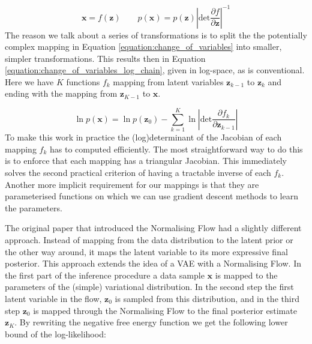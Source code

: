 \documentclass{report}
\newcommand{\bx}{\mathbf{x}}
\newcommand{\bz}{\mathbf{z}}
\newcommand{\parfrac}[2]{\frac{\partial #1}{\partial#2}}
\begin{document}
\begin{equation}\label{equation:change_of_variables}
    \bx = f(\bz) \qquad p(\bx) = p(\bz) \left|\text{det} \parfrac{f}{\bz} \right|^{-1}
\end{equation}
The reason we talk about a series of transformations is to split the the potentially complex mapping in Equation \ref{equation:change_of_variables} into smaller, simpler transformations. This results then in Equation \ref{equation:change_of_variables_log_chain}, given in log-space, as is conventional. Here we have $K$ functions $f_k$ mapping from latent variables $\bz_{k-1}$ to $\bz_k$ and ending with the mapping from $\bz_{K-1}$ to $\bx$.

\begin{equation}\label{equation:change_of_variables_log_chain}
    \ln p(\bx) = \ln p(\bz_0) - \sum\limits^K_{k=1}\ln \left| \text{det} \parfrac{f_k}{\bz_{k-1}} \right|
\end{equation}
To make this work in practice the (log)determinant of the Jacobian of each mapping $f_k$ has to computed efficiently. The most straightforward way to do this is to enforce that each mapping has a triangular Jacobian. This immediately solves the second practical criterion of having a tractable inverse of each $f_k$. Another more implicit requirement for our mappings is that they are parameterised functions on which we can use gradient descent methods to learn the parameters. 

The original paper that introduced the Normalising Flow had a slightly different approach. Instead of mapping from the data distribution to the latent prior or the other way around, it maps the latent variable to its more expressive final posterior. This approach extends the idea of a VAE with a Normalising Flow. In the first part of the inference procedure a data sample $\bx$ is mapped to the parameters of the (simple) variational distribution. In the second step the first latent variable in the flow, $\bz_0$ is sampled from this distribution, and in the third step $\bz_0$ is mapped through the Normalising Flow to the final posterior estimate $\bz_K$. By rewriting the negative free energy function we get the following lower bound of the log-likelihood:
\end{document}

